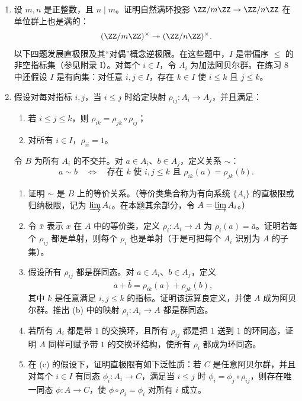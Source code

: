 \begin{enumerate}[label=\arabic*.]
\[	\qquad f(x)\equiv f_k(x)\pmod {n_k},
	\]
	即 $f(x)$ 的系数与 $f_i(x)$ 的系数模 $n_i$ 一致。证明若所有 $f_i(x)$ 都是首一多项式，则 $f(x)$ 也可取为首一。\emph{提示：}对每个系数分别在 $\ZZ$ 中应用中国剩余定理。
	\item 设 $m,n$ 是正整数，且 $n\mid m$。证明自然满环投影 $\ZZ/m\ZZ\to\ZZ/n\ZZ$ 在单位群上也是满的：
	\[
	(\ZZ/m\ZZ)^\times\twoheadrightarrow(\ZZ/n\ZZ)^\times.
	\]
	以下四题发展直极限及其“对偶”概念逆极限。在这些题中，$I$ 是带偏序 $\leq$ 的非空指标集（参见附录 I）。对每个 $i\in I$，令 $A_i$ 为加法阿贝尔群。在练习 8 中还假设 $I$ 是有向集：对任意 $i,j\in I$，存在 $k\in I$ 使 $i\leq k$ 且 $j\leq k$。
	\item 假设对每对指标 $i,j$，当 $i\leq j$ 时给定映射 $\rho_{ij}:A_i\to A_j$，并且满足：
	\begin{enumerate}[label=(\roman*)]
		\item 若 $i\leq j\leq k$，则 $\rho_{ik}=\rho_{jk}\circ\rho_{ij}$；
		\item 对所有 $i\in I$，$\rho_{ii}=1$。
	\end{enumerate}
	令 $B$ 为所有 $A_i$ 的不交并。对 $a\in A_i$、$b\in A_j$，定义关系 $\sim$：
	\[
	a\sim b\quad\Longleftrightarrow\quad \text{存在 }k\text{ 使 }i,j\leq k\text{ 且 }\rho_{ik}(a)=\rho_{jk}(b).
	\]
	\begin{enumerate}[label=(\alph*)]
		\item 证明 $\sim$ 是 $B$ 上的等价关系。（等价类集合称为有向系统 $\{A_i\}$ 的直极限或归纳极限，记为 $\varinjlim A_i$。在本题其余部分，令 $A=\varinjlim A_i$。）
		\item 令 $\bar x$ 表示 $x$ 在 $A$ 中的等价类，定义 $\rho_i:A_i\to A$ 为 $\rho_i(a)=\bar a$。证明若每个 $\rho_{ij}$ 都是单射，则每个 $\rho_i$ 也是单射（于是可把每个 $A_i$ 识别为 $A$ 的子集）。
		\item 假设所有 $\rho_{ij}$ 都是群同态。对 $a\in A_i$、$b\in A_j$，定义
		\[
		\bar a+\bar b=\overline{\rho_{ik}(a)+\rho_{jk}(b)},
		\]
		其中 $k$ 是任意满足 $i,j\leq k$ 的指标。证明该运算良定义，并使 $A$ 成为阿贝尔群。推出 (b) 中的映射 $\rho_i:A_i\to A$ 都是群同态。
		\item 若所有 $A_i$ 都是带 $1$ 的交换环，且所有 $\rho_{ij}$ 都是把 $1$ 送到 $1$ 的环同态，证明 $A$ 同样可赋予带 $1$ 的交换环结构，使所有 $\rho_i$ 都成为环同态。
		\item 在 (c) 的假设下，证明直极限有如下泛性质：若 $C$ 是任意阿贝尔群，并且对每个 $i\in I$ 有同态 $\phi_i:A_i\to C$，满足当 $i\leq j$ 时 $\phi_i=\phi_j\circ\rho_{ij}$，则存在唯一同态 $\phi:A\to C$，使 $\phi\circ\rho_i=\phi_i$ 对所有 $i$ 成立。
	\end{enumerate}

\end{enumerate}
